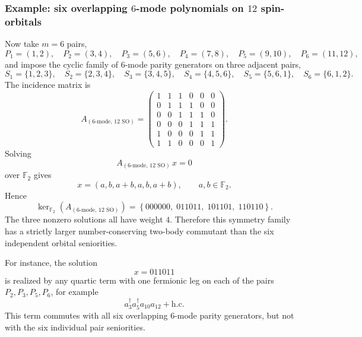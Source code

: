 \documentclass[11pt]{article}
\newcommand{\F}{\mathbb{F}_2}
\theoremstyle{definition}
\theoremstyle{remark}
\begin{document}
\subsubsection{Example: six overlapping $6$-mode polynomials on $12$ spin-orbitals}

Now take $m=6$ pairs,
\begin{equation}
  P_1=(1,2),\quad
  P_2=(3,4),\quad
  P_3=(5,6),\quad
  P_4=(7,8),\quad
  P_5=(9,10),\quad
  P_6=(11,12),
\end{equation}
and impose the cyclic family of $6$-mode parity generators on three adjacent pairs,
\begin{equation}
  S_1=\{1,2,3\},\quad
  S_2=\{2,3,4\},\quad
  S_3=\{3,4,5\},\quad
  S_4=\{4,5,6\},\quad
  S_5=\{5,6,1\},\quad
  S_6=\{6,1,2\}.
\end{equation}
The incidence matrix is
\begin{equation}
  A_{(6\text{-mode},\,12\text{ SO})}
  =
  \begin{pmatrix}
    1&1&1&0&0&0\\
    0&1&1&1&0&0\\
    0&0&1&1&1&0\\
    0&0&0&1&1&1\\
    1&0&0&0&1&1\\
    1&1&0&0&0&1
  \end{pmatrix}.
\end{equation}
Solving
\begin{equation}
  A_{(6\text{-mode},\,12\text{ SO})}\,x=0
\end{equation}
over $\F$ gives
\begin{equation}
  x=(a,b,a+b,a,b,a+b),
  \qquad
  a,b\in \F.
\end{equation}
Hence
\begin{equation}
  \ker_{\F}(A_{(6\text{-mode},\,12\text{ SO})})
  =
  \left\{
  000000,\;
  011011,\;
  101101,\;
  110110
  \right\}.
\end{equation}
The three nonzero solutions all have weight $4$. Therefore this symmetry family has a strictly larger
number-conserving two-body commutant than the six independent orbital seniorities.

For instance, the solution
\begin{equation}
  x=011011
\end{equation}
is realized by any quartic term with one fermionic leg on each of the pairs $P_2,P_3,P_5,P_6$, for example
\begin{equation}
  a_3^\dagger a_5^\dagger a_{10} a_{12}+\mathrm{h.c.}
\end{equation}
This term commutes with all six overlapping $6$-mode parity generators, but not with the six individual pair seniorities.
\end{document}
